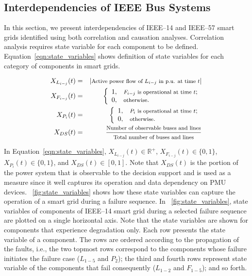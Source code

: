 \documentclass[12pt]{elsarticle}
\begin{document}
\subsection{Interdependencies of IEEE Bus Systems}
\label{sec:case_study:interdep}
In this section, we present interdependencies of IEEE--14 and IEEE--57 smart grids identified using both correlation and causation analyses. Correlation analysis requires state variable for each component to be defined. Equation~\eqref{eqn:state_variables} shows definition of state variables for each category of components in smart grids.

\begin{eqnarray}
X_{L_{i-j}}(t) &=& |\text{\footnotesize Active power flow of $L_{i-j}$ in p.u. at time $t$}| \nonumber \\
X_{F_{i-j}}(t) &=& \left\{
                     \begin{array}{ll}
                       1, & \hbox{\text{\footnotesize $F_{i-j}$ is operational at time $t$};} \\
                       0, & \hbox{\text{\footnotesize otherwise}.}
                     \end{array}
                   \right. \nonumber \\
X_{P_{i}}(t) &=& \left\{
                     \begin{array}{ll}
                       1, & \hbox{\text{\footnotesize $P_{i}$ is operational at time $t$};} \\
                       0, & \hbox{\text{\footnotesize otherwise}.}
                     \end{array}
                   \right. \nonumber \\
X_{DS}(t) &=& \dfrac{\text{\footnotesize Number of observable buses and lines}}{\text{\footnotesize Total number of buses and lines}}
\label{eqn:state_variables}
\end{eqnarray}

In Equation~\eqref{eqn:state_variables}, $X_{L_{i-j}}(t) \in \mathbb{R}^+$, $X_{F_{i-j}}(t)\in \{0, 1\}$, $X_{P_{i}}(t) \in \{0, 1\}$, and $X_{DS}(t) \in [0, 1]$. Note that $X_{DS}(t)$ is the portion of the power system that is observable to the decision support and is used as a measure since it well captures its operation and data dependency on PMU devices. \figurename~\ref{fig:state_variables} shows how these state variables can capture the operation of a smart grid during a failure sequence. In \figurename~\ref{fig:state_variables}, state variables of components of IEEE--14 smart grid during a selected failure sequence are plotted on a single horizontal axis. Note that the state variables are shown for components that experience degradation only. Each row presents the state variable of a component. The rows are ordered according to the propagation of the faults, i.e., the two topmost rows correspond to the components whose failure initiates the failure case ($L_{1-5}$ and $P_2$); the third and fourth rows represent state variable of the components that fail consequently ($L_{1-2}$ and $F_{1-5}$); and so forth.
\end{document}
